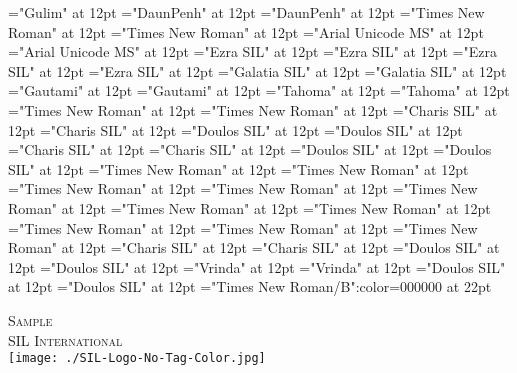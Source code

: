 \documentclass[c5paper,twoside]{article}
\begin{document}
\font\divko="Gulim" at 12pt
\font\spankm="DaunPenh" at 12pt
\font\divkm="DaunPenh" at 12pt
\font\spanid="Times New Roman" at 12pt
\font\divid="Times New Roman" at 12pt
\font\spanhi="Arial Unicode MS" at 12pt
\font\divhi="Arial Unicode MS" at 12pt
\font\spanhe="Ezra SIL" at 12pt
\font\divhe="Ezra SIL" at 12pt
\font\spanhbo="Ezra SIL" at 12pt
\font\divhbo="Ezra SIL" at 12pt
\font\spangrc="Galatia SIL" at 12pt
\font\divgrc="Galatia SIL" at 12pt
\font\spanggoTeluIN="Gautami" at 12pt
\font\divggoTeluIN="Gautami" at 12pt
\font\spanggofonipaxemic="Tahoma" at 12pt
\font\divggofonipaxemic="Tahoma" at 12pt
\font\spanfr="Times New Roman" at 12pt
\font\divfr="Times New Roman" at 12pt
\font\spanfrZxxxxaudio="Charis SIL" at 12pt
\font\divfrZxxxxaudio="Charis SIL" at 12pt
\font\spanflr="Doulos SIL" at 12pt
\font\divflr="Doulos SIL" at 12pt
\font\spanflrZxxxxaudio="Charis SIL" at 12pt
\font\divflrZxxxxaudio="Charis SIL" at 12pt
\font\spanflrQaaaxtone="Doulos SIL" at 12pt
\font\divflrQaaaxtone="Doulos SIL" at 12pt
\font\spanfa="Times New Roman" at 12pt
\font\divfa="Times New Roman" at 12pt
\font\spanes="Times New Roman" at 12pt
\font\dives="Times New Roman" at 12pt
\font\spanen="Times New Roman" at 12pt
\font\diven="Times New Roman" at 12pt
\font\spanenfonipa="Times New Roman" at 12pt
\font\divenfonipa="Times New Roman" at 12pt
\font\spande="Times New Roman" at 12pt
\font\divde="Times New Roman" at 12pt
\font\spanbzh="Charis SIL" at 12pt
\font\divbzh="Charis SIL" at 12pt
\font\spanbzhfonipa="Doulos SIL" at 12pt
\font\divbzhfonipa="Doulos SIL" at 12pt
\font\spanbn="Vrinda" at 12pt
\font\divbn="Vrinda" at 12pt
\font\spanbdu="Doulos SIL" at 12pt
\font\divbdu="Doulos SIL" at 12pt
\color{black} 
\thispagestyle{empty} 
\font\CoverPageHeading="Times New Roman/B":color=000000 at 22pt 
\vskip 60pt 
\begin{center} 
\end{center} 
\newpage 
\newpage 
\thispagestyle{empty} 
\mbox{} 
\begin{titlepage}
\begin{center}
\textsc{\LARGE Sample}\\[1.5cm] 
\vspace{140 mm} 
\textsc{SIL International}\\[0.5cm] 
\texttt{[image: ./SIL-Logo-No-Tag-Color.jpg]}\\[1cm]    
\end{center} 
\end{titlepage} 
\newpage 
\newpage 
\mbox{} 
\setcounter{page}{3} 
 
\pagestyle{plain} 
\newpage 
\newpage 
\thispagestyle{empty} 
\mbox{} 
\end{document}
